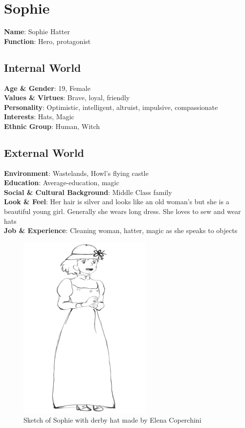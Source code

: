 \section{Sophie}

\begin{minipage}{0.5\textwidth}
\textbf{Name}: Sophie Hatter \\
\textbf{Function}: Hero, protagonist

\subsection{Internal World}

\textbf{Age \& Gender}: 19, Female \\
\textbf{Values \& Virtues}: Brave, loyal, friendly \\
\textbf{Personality}: Optimistic, intelligent, altruist, impulsive, compassionate \\
\textbf{Interests}: Hats, Magic \\
\textbf{Ethnic Group}: Human, Witch

\subsection{External World}
\textbf{Environment}: Wastelands, Howl’s flying castle \\
\textbf{Education}: Average-education, magic \\
\textbf{Social \& Cultural Background}: Middle Class family \\
\textbf{Look \& Feel}: Her hair is silver and looks like an old woman's but she is a beautiful young girl. Generally she wears long dress. She loves to sew and wear hats \\
\textbf{Job \& Experience}: Cleaning woman, hatter, magic as she speaks to objects \\

\end{minipage}%
%
\hfill\begin{minipage}{0.4\textwidth}
\begin{figure}[H]
  \includegraphics{Images/Characters/sophie_portrait}
  \caption{Sketch of Sophie with derby hat made by Elena Coperchini}
  \end{figure}
\end{minipage}

